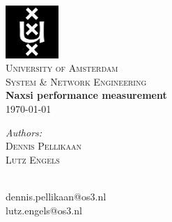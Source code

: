 \documentclass{article}
\begin{document}
\begin{titlepage}
\begin{center}
\includegraphics[width=0.15\textwidth]{images/uva-logo.png}\\[1cm]
\textsc{\LARGE University of Amsterdam}\\[0.5cm]
\textsc{\Large System \& Network Engineering}\\[2cm]
{\huge \bfseries Naxsi performance measurement}\\[0.2cm]
{\large \today}\\
\end{center}

\vfill

\begin{minipage}[t]{0.4\textwidth}
\begin{flushleft} \large
\emph{Authors:}\\
\textsc{Dennis Pellikaan}\\
\textsc{Lutz Engels}\\[1cm]
\end{flushleft}
\end{minipage}
\begin{minipage}[t]{0.4\textwidth}
\begin{flushright} \large
\mbox{ }\\
dennis.pellikaan@os3.nl\\
lutz.engels@os3.nl\\
\end{flushright}
\end{minipage}
\end{titlepage}


\newpage
\tableofcontents
\newpage









\appendix



%
\end{document}
